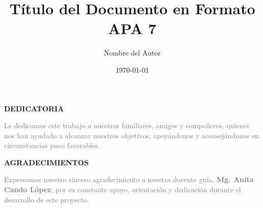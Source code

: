 \documentclass[12pt]{article} %
\title{Título del Documento en Formato APA 7}
\author{Nombre del Autor}
\date{\today}
\begin{document}
\imprimircaratula

\begin{center}
    \vspace*{3cm} 
    \normalsize \textbf{DEDICATORIA} 
    \vspace{6cm}
\end{center}
\hspace{7.9cm}
\begin{minipage}{\dimexpr\textwidth-8cm}
    \textcolor{gray}{
        Le dedicamos este trabajo a nuestros familiares, amigos y compañeros, 
        quienes nos han ayudado a alcanzar nuestros objetivos, apoyándonos y 
        aconsejándonos en circunstancias poco favorables.
    }
\end{minipage}

\newpage

\begin{center}
    \vspace*{3cm} 
    \normalsize \textbf{AGRADECIMIENTOS} 
    \vspace{6cm}
\end{center}
\hspace{7.9cm}
\begin{minipage}{\dimexpr\textwidth-8cm}
    \textcolor{gray}{
        Expresamos nuestro sincero agradecimiento a nuestra docente guía, \textbf{Mg. Anita Cando López}, por su constante apoyo, orientación y dedicación durante el desarrollo de este proyecto.
    }
\end{minipage}

\newpage

\tableofcontents
\newpage

\listoffigures
\newpage




\begin{abstract}

\end{abstract}
\newpage

\section*{}
\setcounter{section}{1}
\newpage
\end{document}
